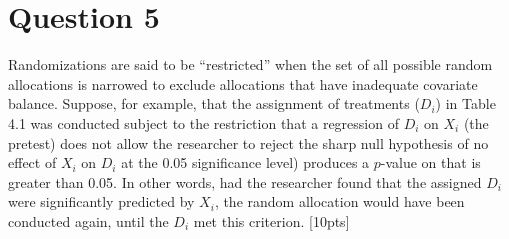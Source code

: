 \documentclass[11pt,notitlepage]{article}\usepackage[]{graphicx}\usepackage[]{color}
\begin{document}
\section*{Question 5}


Randomizations are said to be ``restricted'' when the set of all possible random allocations is narrowed to exclude allocations that have inadequate covariate balance.  Suppose, for example, that the assignment of treatments ($D_i$) in Table 4.1 was conducted subject to the restriction that a regression of $D_i$ on $X_i$ (the pretest) does not allow the researcher to reject the sharp null hypothesis of no effect of $X_i$ on $D_i$ at the 0.05 significance level) produces a $p$-value on that is greater than 0.05. In other words, had the researcher found that the assigned $D_i$ were significantly predicted by $X_i$, the random allocation would have been conducted again, until the $D_i$ met this criterion. [10pts]
\end{document}
